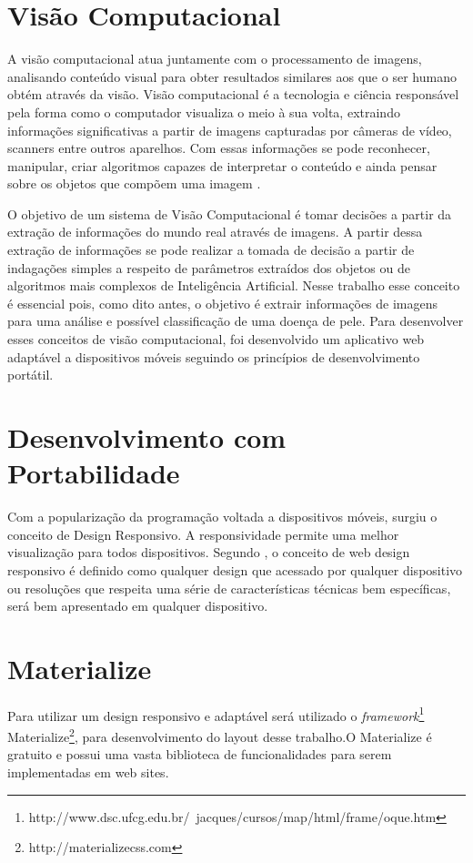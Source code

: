 \documentclass[openright]{ifrs} %
\begin{document}
 
\section{Visão Computacional}

A visão computacional atua juntamente com o processamento de imagens, analisando conteúdo visual para obter resultados similares aos que o ser humano obtém através da visão. Visão computacional é a tecnologia e ciência responsável pela forma como o computador visualiza o meio à sua volta, extraindo informações significativas a partir de imagens capturadas por câmeras de vídeo, scanners entre outros aparelhos. Com essas informações se pode reconhecer, manipular, criar algoritmos capazes de interpretar o conteúdo e ainda pensar sobre os objetos que compõem uma imagem \cite{neves2012avanccos}.

O objetivo de um sistema de Visão Computacional é tomar decisões a partir da extração de informações do mundo real através de imagens. A partir dessa extração de informações se pode realizar a tomada de decisão a partir de indagações simples a respeito de parâmetros extraídos dos objetos ou de algoritmos mais complexos de Inteligência Artificial. Nesse trabalho esse conceito é essencial pois, como dito antes, o objetivo é extrair informações de imagens para uma análise e possível classificação de uma doença de pele. Para desenvolver esses conceitos de visão computacional, foi desenvolvido um aplicativo web adaptável a dispositivos móveis seguindo os princípios de desenvolvimento portátil.


\section{Desenvolvimento com Portabilidade}
Com a popularização da programação voltada a dispositivos móveis, surgiu o conceito de Design Responsivo. A responsividade permite uma melhor visualização para todos dispositivos. Segundo \citeauthor{zemel2015web}, o conceito de web design responsivo é  definido como qualquer design que acessado por qualquer dispositivo ou resoluções que respeita uma série de características técnicas bem específicas, será  bem apresentado em qualquer  dispositivo.

\section{Materialize}

Para utilizar um design responsivo e adaptável será utilizado o \textit{framework}\footnote{http://www.dsc.ufcg.edu.br/~jacques/cursos/map/html/frame/oque.htm} Materialize\footnote{http://materializecss.com}, para desenvolvimento do layout desse trabalho.O Materialize é gratuito e possui uma vasta biblioteca de funcionalidades para serem implementadas em web sites.
\end{document}
